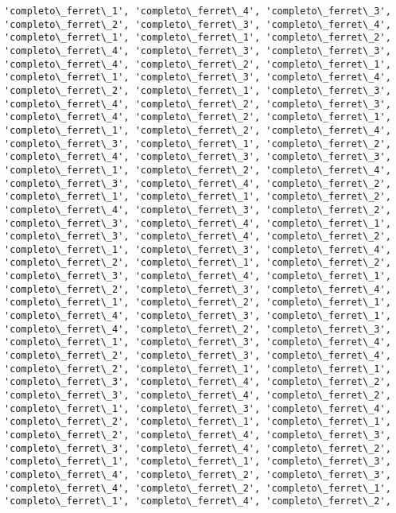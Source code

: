 \documentclass[11pt]{article}
\begin{document}
\begin{Verbatim}[commandchars=\\\{\}]
'completo\_ferret\_1', 'completo\_ferret\_4', 'completo\_ferret\_3',
'completo\_ferret\_2', 'completo\_ferret\_3', 'completo\_ferret\_4',
'completo\_ferret\_1', 'completo\_ferret\_1', 'completo\_ferret\_2',
'completo\_ferret\_4', 'completo\_ferret\_3', 'completo\_ferret\_3',
'completo\_ferret\_4', 'completo\_ferret\_2', 'completo\_ferret\_1',
'completo\_ferret\_1', 'completo\_ferret\_3', 'completo\_ferret\_4',
'completo\_ferret\_2', 'completo\_ferret\_1', 'completo\_ferret\_3',
'completo\_ferret\_4', 'completo\_ferret\_2', 'completo\_ferret\_3',
'completo\_ferret\_4', 'completo\_ferret\_2', 'completo\_ferret\_1',
'completo\_ferret\_1', 'completo\_ferret\_2', 'completo\_ferret\_4',
'completo\_ferret\_3', 'completo\_ferret\_1', 'completo\_ferret\_2',
'completo\_ferret\_4', 'completo\_ferret\_3', 'completo\_ferret\_3',
'completo\_ferret\_1', 'completo\_ferret\_2', 'completo\_ferret\_4',
'completo\_ferret\_3', 'completo\_ferret\_4', 'completo\_ferret\_2',
'completo\_ferret\_1', 'completo\_ferret\_1', 'completo\_ferret\_2',
'completo\_ferret\_4', 'completo\_ferret\_3', 'completo\_ferret\_2',
'completo\_ferret\_3', 'completo\_ferret\_4', 'completo\_ferret\_1',
'completo\_ferret\_3', 'completo\_ferret\_4', 'completo\_ferret\_2',
'completo\_ferret\_1', 'completo\_ferret\_3', 'completo\_ferret\_4',
'completo\_ferret\_2', 'completo\_ferret\_1', 'completo\_ferret\_2',
'completo\_ferret\_3', 'completo\_ferret\_4', 'completo\_ferret\_1',
'completo\_ferret\_2', 'completo\_ferret\_3', 'completo\_ferret\_4',
'completo\_ferret\_1', 'completo\_ferret\_2', 'completo\_ferret\_1',
'completo\_ferret\_4', 'completo\_ferret\_3', 'completo\_ferret\_1',
'completo\_ferret\_4', 'completo\_ferret\_2', 'completo\_ferret\_3',
'completo\_ferret\_1', 'completo\_ferret\_3', 'completo\_ferret\_4',
'completo\_ferret\_2', 'completo\_ferret\_3', 'completo\_ferret\_4',
'completo\_ferret\_2', 'completo\_ferret\_1', 'completo\_ferret\_1',
'completo\_ferret\_3', 'completo\_ferret\_4', 'completo\_ferret\_2',
'completo\_ferret\_3', 'completo\_ferret\_4', 'completo\_ferret\_2',
'completo\_ferret\_1', 'completo\_ferret\_3', 'completo\_ferret\_4',
'completo\_ferret\_2', 'completo\_ferret\_1', 'completo\_ferret\_1',
'completo\_ferret\_2', 'completo\_ferret\_4', 'completo\_ferret\_3',
'completo\_ferret\_3', 'completo\_ferret\_4', 'completo\_ferret\_2',
'completo\_ferret\_1', 'completo\_ferret\_1', 'completo\_ferret\_3',
'completo\_ferret\_4', 'completo\_ferret\_2', 'completo\_ferret\_3',
'completo\_ferret\_4', 'completo\_ferret\_2', 'completo\_ferret\_1',
'completo\_ferret\_1', 'completo\_ferret\_4', 'completo\_ferret\_2',

\end{Verbatim}
\end{document}
